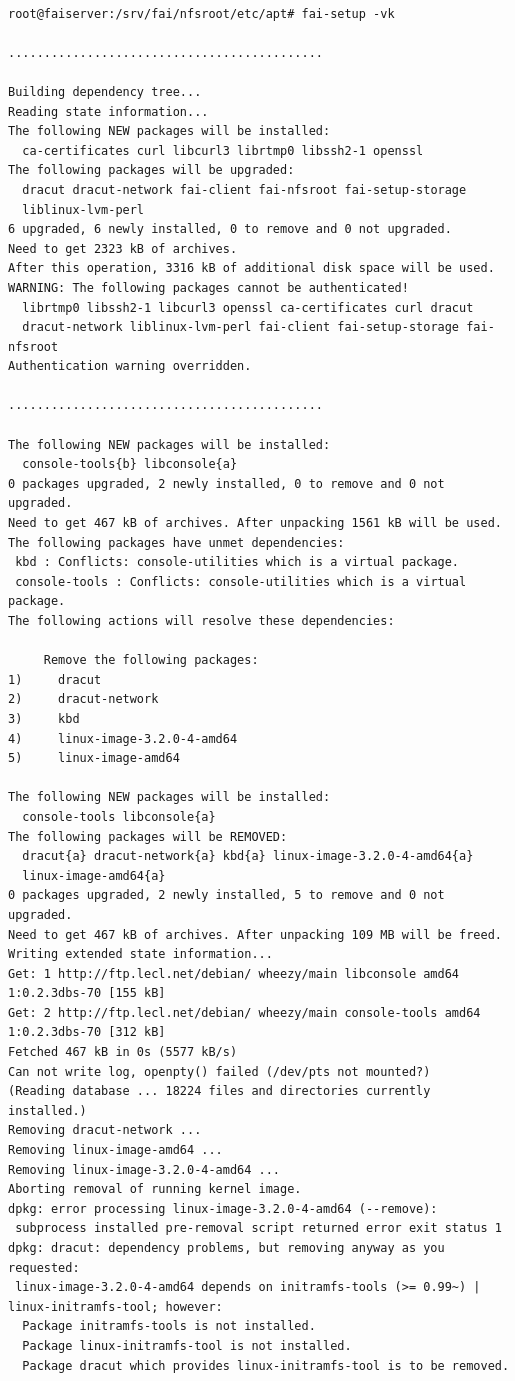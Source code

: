 \documentclass[11pt
  , a4paper
  , article
  , oneside
]{memoir}
\begin{document}
\begin{lstlisting}

root@faiserver:/srv/fai/nfsroot/etc/apt# fai-setup -vk

............................................

Building dependency tree...
Reading state information...
The following NEW packages will be installed:
  ca-certificates curl libcurl3 librtmp0 libssh2-1 openssl
The following packages will be upgraded:
  dracut dracut-network fai-client fai-nfsroot fai-setup-storage
  liblinux-lvm-perl
6 upgraded, 6 newly installed, 0 to remove and 0 not upgraded.
Need to get 2323 kB of archives.
After this operation, 3316 kB of additional disk space will be used.
WARNING: The following packages cannot be authenticated!
  librtmp0 libssh2-1 libcurl3 openssl ca-certificates curl dracut
  dracut-network liblinux-lvm-perl fai-client fai-setup-storage fai-nfsroot
Authentication warning overridden.

............................................

The following NEW packages will be installed:
  console-tools{b} libconsole{a} 
0 packages upgraded, 2 newly installed, 0 to remove and 0 not upgraded.
Need to get 467 kB of archives. After unpacking 1561 kB will be used.
The following packages have unmet dependencies:
 kbd : Conflicts: console-utilities which is a virtual package.
 console-tools : Conflicts: console-utilities which is a virtual package.
The following actions will resolve these dependencies:

     Remove the following packages:
1)     dracut                      
2)     dracut-network              
3)     kbd                         
4)     linux-image-3.2.0-4-amd64   
5)     linux-image-amd64           

The following NEW packages will be installed:
  console-tools libconsole{a} 
The following packages will be REMOVED:
  dracut{a} dracut-network{a} kbd{a} linux-image-3.2.0-4-amd64{a} 
  linux-image-amd64{a} 
0 packages upgraded, 2 newly installed, 5 to remove and 0 not upgraded.
Need to get 467 kB of archives. After unpacking 109 MB will be freed.
Writing extended state information...
Get: 1 http://ftp.lecl.net/debian/ wheezy/main libconsole amd64 1:0.2.3dbs-70 [155 kB]
Get: 2 http://ftp.lecl.net/debian/ wheezy/main console-tools amd64 1:0.2.3dbs-70 [312 kB]
Fetched 467 kB in 0s (5577 kB/s)
Can not write log, openpty() failed (/dev/pts not mounted?)
(Reading database ... 18224 files and directories currently installed.)
Removing dracut-network ...
Removing linux-image-amd64 ...
Removing linux-image-3.2.0-4-amd64 ...
Aborting removal of running kernel image.
dpkg: error processing linux-image-3.2.0-4-amd64 (--remove):
 subprocess installed pre-removal script returned error exit status 1
dpkg: dracut: dependency problems, but removing anyway as you requested:
 linux-image-3.2.0-4-amd64 depends on initramfs-tools (>= 0.99~) | linux-initramfs-tool; however:
  Package initramfs-tools is not installed.
  Package linux-initramfs-tool is not installed.
  Package dracut which provides linux-initramfs-tool is to be removed.


\end{lstlisting}
\end{document}
